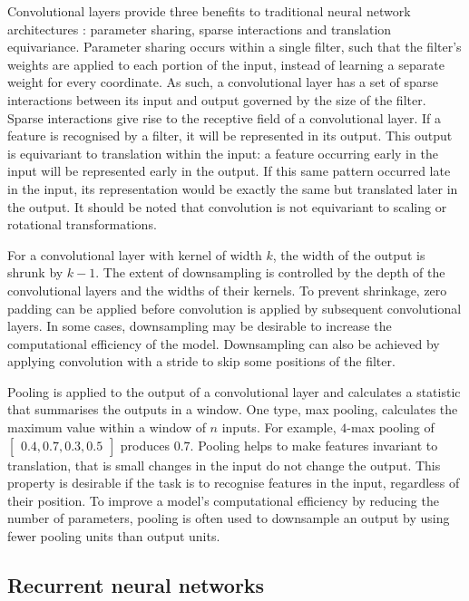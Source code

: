 Convolutional layers provide three benefits to traditional neural network architectures \cite{Goodfellow2016}: parameter sharing, sparse interactions and translation equivariance. Parameter sharing occurs within a single filter, such that the filter's weights are applied to each portion of the input, instead of learning a separate weight for every coordinate. As such, a convolutional layer has a set of sparse interactions between its input and output governed by the size of the filter. Sparse interactions give rise to the receptive field of a convolutional layer. If a feature is recognised by a filter, it will be represented in its output. This output is equivariant to translation within the input: a feature occurring early in the input will be represented early in the output. If this same pattern occurred late in the input, its representation would be exactly the same but translated later in the output. It should be noted that convolution is not equivariant to scaling or rotational transformations.

For a convolutional layer with kernel of width $k$, the width of the output is shrunk by $k-1$. The extent of downsampling is controlled by the depth of the convolutional layers and the widths of their kernels. To prevent shrinkage, zero padding can be applied before convolution is applied by subsequent convolutional layers. In some cases, downsampling may be desirable to increase the computational efficiency of the model. Downsampling can also be achieved by applying convolution with a stride to skip some positions of the filter.

Pooling is applied to the output of a convolutional layer and calculates a statistic that summarises the outputs in a window. One type, max pooling, calculates the maximum value within a window of $n$ inputs. For example, $4$-max pooling of $\begin{bmatrix}0.4, 0.7, 0.3, 0.5\end{bmatrix}$ produces $0.7$. Pooling helps to make features invariant to translation, that is small changes in the input do not change the output. This property is desirable if the task is to recognise features in the input, regardless of their position. To improve a model's computational efficiency by reducing the number of parameters, pooling is often used to downsample an output by using fewer pooling units than output units.

\subsection{Recurrent neural networks}

